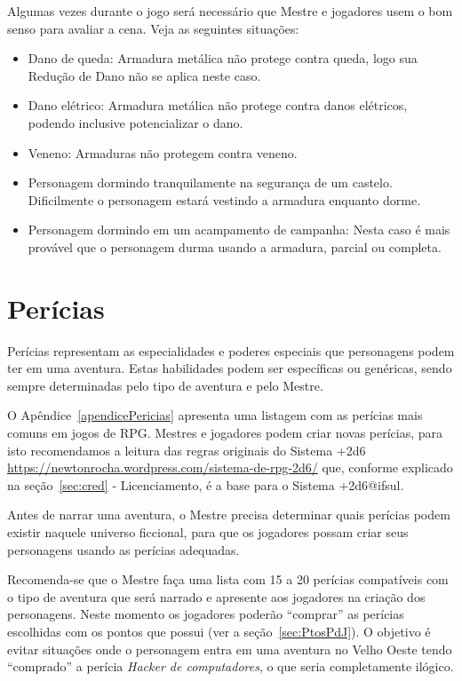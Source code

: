Algumas vezes durante o jogo será necessário que Mestre e jogadores usem o bom senso para avaliar a cena. Veja as seguintes situações:

\begin{itemize}
	\item Dano de queda: Armadura metálica não protege contra queda, logo sua Redução de Dano não se aplica neste caso.
	\item Dano elétrico: Armadura metálica não protege contra danos elétricos, podendo inclusive potencializar o dano.
	\item Veneno: Armaduras não protegem contra veneno.
	\item Personagem dormindo tranquilamente na segurança de um castelo. Dificilmente o personagem estará vestindo a armadura enquanto dorme. 
	\item Personagem dormindo em um acampamento de campanha: Nesta caso é mais provável que o personagem durma usando a armadura, parcial ou completa.
\end{itemize}
	
\section{\label{subsecPericias}Perícias}
Perícias representam as especialidades e poderes especiais que personagens podem ter em uma aventura. Estas habilidades podem ser específicas ou genéricas, sendo sempre determinadas pelo tipo de aventura e pelo Mestre. 
 
O Apêndice~\ref{apendicePericias} apresenta uma listagem com as perícias mais comuns em jogos de RPG. Mestres e jogadores podem criar novas perícias, para isto recomendamos a leitura das regras originais do Sistema +2d6 \url{https://newtonrocha.wordpress.com/sistema-de-rpg-2d6/} que, conforme explicado na seção~\ref{sec:cred} - Licenciamento, é a base para o Sistema +2d6@ifsul.
 
Antes de narrar uma aventura, o Mestre precisa determinar quais perícias podem existir naquele universo ficcional, para que os jogadores possam criar seus personagens usando as perícias adequadas. 

Recomenda-se que o Mestre faça uma lista com 15 a 20 perícias compatíveis com o tipo de aventura que será narrado e apresente aos jogadores na criação dos personagens. Neste momento os jogadores poderão ``comprar'' as perícias escolhidas com os pontos que possui (ver a seção~\ref{sec:PtosPdJ}). O objetivo é evitar situações onde o personagem entra em uma aventura no Velho Oeste tendo ``comprado'' a perícia \emph{Hacker de computadores}, o que seria completamente ilógico.



